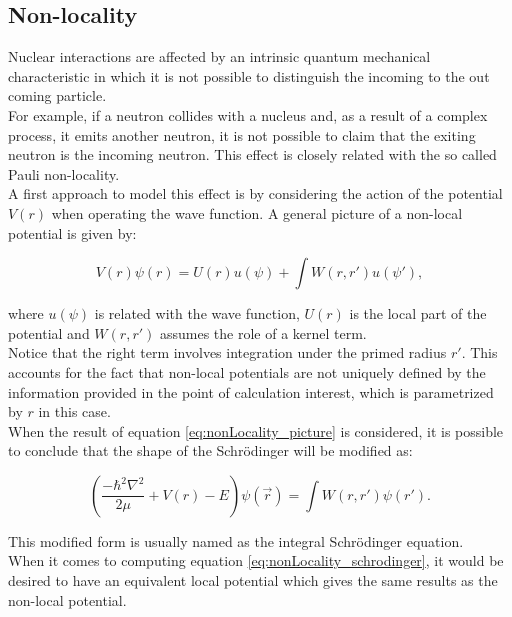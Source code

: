 \documentclass[openany]{book}
\begin{document}
\subsection{Non-locality}  \label{sub:potential_nonlocality}

Nuclear interactions are affected by an intrinsic quantum mechanical characteristic in which it is not possible to distinguish the incoming to the out coming particle. \\

For example, if a neutron collides with a nucleus and, as a result of a complex process, it emits another neutron, it is not possible to claim that the exiting neutron is the incoming neutron.  This effect is closely related with the so called Pauli non-locality. \\

A first approach to model this effect is by considering the action of the potential $V(r)$ when operating the wave function. A general picture of a non-local potential is given by:

\begin{equation} \label{eq:nonLocality_picture}
	V(r) \psi(r) = U(r) u(\psi) + \int W(r, r') u(\psi'),
\end{equation}

where $u(\psi)$ is related with the wave function, $U(r)$ is the local part of the potential and $W(r, r')$ assumes the role of a kernel term. \\

Notice that the right term involves integration under the primed radius $r'$. This accounts for the fact that non-local potentials are not uniquely defined by the information provided in the point of calculation interest, which is parametrized by $r$ in this case. \\

When the result of equation \ref{eq:nonLocality_picture} is considered, it is possible to conclude that the shape of the Schrödinger will be modified as:

\begin{equation} \label{eq:nonLocality_schrodinger}
	\left(\frac{-\hbar^2 \nabla^2}{2\mu} + V(r)  - E  \right) \psi(\vec r) =   \int W(r, r') \psi(r').
\end{equation}

This modified form is usually named as the integral Schrödinger equation. \\

When it comes to computing equation \ref{eq:nonLocality_schrodinger}, it would be desired to have an equivalent local potential which gives the same results as the non-local potential. \\
\end{document}
